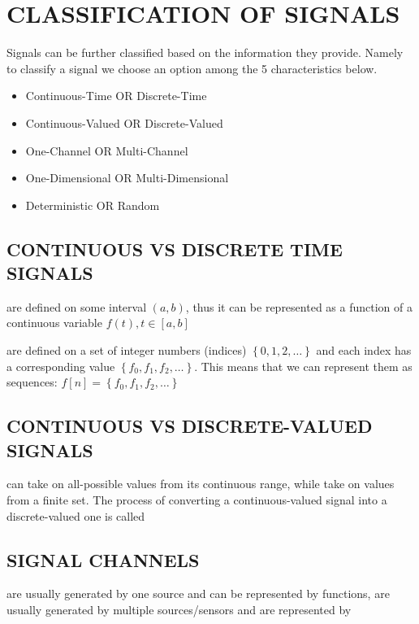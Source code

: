 \documentclass[]{report}
\newcommand{\keyword}[1]{{{\color{green}{#1}}}}
\renewcommand{\emph}[1]{} %
\begin{document}
\section{CLASSIFICATION OF SIGNALS}

Signals can be further classified based on the information they provide. Namely to classify a signal we choose an option among the 5 characteristics below.
\begin{itemize}
	\item Continuous-Time OR Discrete-Time
	\item Continuous-Valued OR Discrete-Valued
	\item One-Channel OR Multi-Channel
	\item One-Dimensional OR Multi-Dimensional
	\item Deterministic OR Random
\end{itemize}

\subsection*{CONTINUOUS VS DISCRETE TIME SIGNALS}

\keyword{Continuous-time signals} are defined on some interval $(a,b)$, thus it can be represented as a function of a continuous variable $f\left( t \right) , t\in\left[ a,b\right]$

\keyword{Discrete-time signals} are defined on a set of integer numbers (indices) $\left\{ 0,1,2,\ldots \right\}$ and each index has a corresponding value $\left\{ f_0,f_1,f_2,\ldots \right\}$. This means that we can represent them as sequences: $f\left[ n\right] = \left\{ f_0,f_1,f_2,\ldots \right\}$

\subsection*{CONTINUOUS VS DISCRETE-VALUED SIGNALS}

\keyword{Continuous-valued signals} can take on all-possible values from its continuous range, while
\keyword{discrete-valued signals} take on values from a finite set. The process of converting a continuous-valued signal into a discrete-valued one is called \keyword{quantization}

\subsection*{SIGNAL CHANNELS}
\keyword{single channel signals} are usually generated by one source and can be represented by \emph{scalar} functions, \keyword{multi-channel signals} are usually generated by multiple sources/sensors and are represented by \emph{vector functions}
\end{document}
